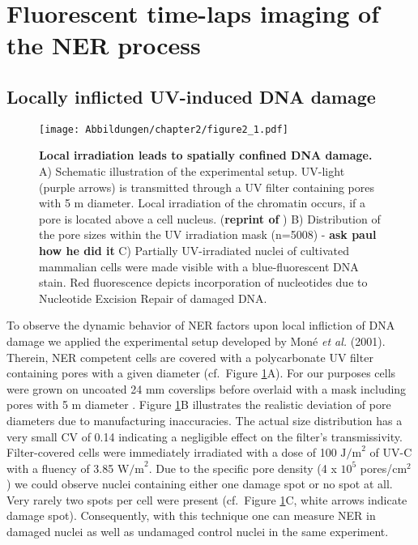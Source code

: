 	
	
\section{Fluorescent time-laps imaging of the NER process}

\subsection{Locally inflicted UV-induced DNA damage}

\begin{figure}[htbp]
	\begin{center}
		\texttt{[image: Abbildungen/chapter2/figure2\_1.pdf]}
		\caption{\textbf{Local irradiation leads to spatially confined DNA damage.} A) Schematic illustration of the experimental setup. UV-light (purple arrows) is transmitted through a UV filter containing pores with 5 \textmu m diameter. Local irradiation of the chromatin occurs, if a pore is located above a cell nucleus. (\textbf{reprint of }) B) Distribution of the pore sizes within the UV irradiation mask (n=5008) - \textbf{ask paul how he did it} C) Partially UV-irradiated nuclei of cultivated mammalian cells were made visible with a blue-fluorescent DNA stain. Red fluorescence depicts incorporation of nucleotides due to Nucleotide Excision Repair of damaged DNA.}
		\label{fig:accuMethod}
	\end{center}
\end{figure} 

To observe the dynamic behavior of NER factors upon local infliction of DNA damage we applied the experimental setup developed by Mon\'e \textit{et al.} (2001)\cite{Mone2001}. Therein, NER competent cells are covered with a polycarbonate UV filter containing pores with a given diameter (cf.\ Figure \ref{fig:accuMethod}A). For our purposes cells were grown on uncoated 24 mm coverslips before overlaid with a mask including pores with 5 \textmu m diameter \cite{Verbruggen2014}. Figure \ref{fig:accuMethod}B illustrates the realistic deviation of pore diameters due to manufacturing inaccuracies. The actual size distribution has a very small CV of 0.14 indicating a negligible effect on the filter's transmissivity. Filter-covered cells were immediately irradiated with a dose of 100 $\text{J/m}^\text{2}$ of UV-C with a fluency of 3.85 $\text{W/m}^\text{2}$. Due to the specific pore density (4 x $\text{10}^\text{5}$ pores/$\text{cm}^\text{2}$) we could observe nuclei containing either one damage spot or no spot at all. Very rarely two spots per cell were present (cf.\ Figure \ref{fig:accuMethod}C, white arrows indicate damage spot). Consequently, with this technique one can measure NER in damaged nuclei as well as undamaged control nuclei in the same experiment.



